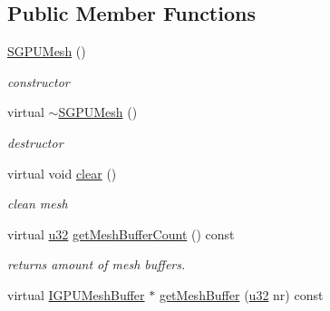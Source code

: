 \subsection*{Public Member Functions}
\begin{DoxyCompactItemize}
\item 
\hyperlink{classirr_1_1scene_1_1SGPUMesh_a5bc49c0c213f0380d3c3d59680d3daaf}{S\+G\+P\+U\+Mesh} ()\hypertarget{classirr_1_1scene_1_1SGPUMesh_a5bc49c0c213f0380d3c3d59680d3daaf}{}\label{classirr_1_1scene_1_1SGPUMesh_a5bc49c0c213f0380d3c3d59680d3daaf}

\begin{DoxyCompactList}\small\item\em constructor \end{DoxyCompactList}\item 
virtual \hyperlink{classirr_1_1scene_1_1SGPUMesh_a7ebdb5152f94135f23046f8e43a73d3b}{$\sim$\+S\+G\+P\+U\+Mesh} ()\hypertarget{classirr_1_1scene_1_1SGPUMesh_a7ebdb5152f94135f23046f8e43a73d3b}{}\label{classirr_1_1scene_1_1SGPUMesh_a7ebdb5152f94135f23046f8e43a73d3b}

\begin{DoxyCompactList}\small\item\em destructor \end{DoxyCompactList}\item 
virtual void \hyperlink{classirr_1_1scene_1_1SGPUMesh_a2ffe360fd7cdb0a27b131ab9a4cd1d6c}{clear} ()\hypertarget{classirr_1_1scene_1_1SGPUMesh_a2ffe360fd7cdb0a27b131ab9a4cd1d6c}{}\label{classirr_1_1scene_1_1SGPUMesh_a2ffe360fd7cdb0a27b131ab9a4cd1d6c}

\begin{DoxyCompactList}\small\item\em clean mesh \end{DoxyCompactList}\item 
virtual \hyperlink{namespaceirr_a0416a53257075833e7002efd0a18e804}{u32} \hyperlink{classirr_1_1scene_1_1SGPUMesh_a7978038f8a6f7f89df9df69dfaf36d57}{get\+Mesh\+Buffer\+Count} () const \hypertarget{classirr_1_1scene_1_1SGPUMesh_a7978038f8a6f7f89df9df69dfaf36d57}{}\label{classirr_1_1scene_1_1SGPUMesh_a7978038f8a6f7f89df9df69dfaf36d57}

\begin{DoxyCompactList}\small\item\em returns amount of mesh buffers. \end{DoxyCompactList}\item 
virtual \hyperlink{classirr_1_1scene_1_1IGPUMeshBuffer}{I\+G\+P\+U\+Mesh\+Buffer} $\ast$ \hyperlink{classirr_1_1scene_1_1SGPUMesh_af3f219d8cb7c6ade7ff48e52b68cfde8}{get\+Mesh\+Buffer} (\hyperlink{namespaceirr_a0416a53257075833e7002efd0a18e804}{u32} nr) const \hypertarget{classirr_1_1scene_1_1SGPUMesh_af3f219d8cb7c6ade7ff48e52b68cfde8}{}\label{classirr_1_1scene_1_1SGPUMesh_af3f219d8cb7c6ade7ff48e52b68cfde8}


\end{DoxyCompactItemize}
